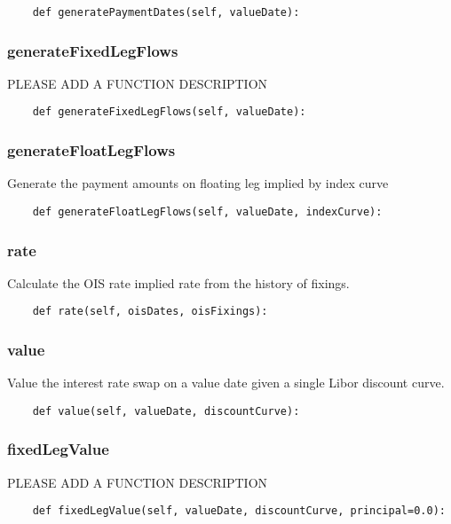 \documentclass[twoside,11pt]{book}
\begin{document}
\begin{lstlisting}
    def generatePaymentDates(self, valueDate):
\end{lstlisting}

\subsubsection*{{\bf generateFixedLegFlows}}
PLEASE ADD A FUNCTION DESCRIPTION

\begin{lstlisting}
    def generateFixedLegFlows(self, valueDate):
\end{lstlisting}

\subsubsection*{{\bf generateFloatLegFlows}}
Generate the payment amounts on floating leg implied by index curve  

\begin{lstlisting}
    def generateFloatLegFlows(self, valueDate, indexCurve):
\end{lstlisting}

\subsubsection*{{\bf rate}}
Calculate the OIS rate implied rate from the history of fixings.  

\begin{lstlisting}
    def rate(self, oisDates, oisFixings):
\end{lstlisting}

\subsubsection*{{\bf value}}
Value the interest rate swap on a value date given a single Libor discount curve.  

\begin{lstlisting}
    def value(self, valueDate, discountCurve):
\end{lstlisting}

\subsubsection*{{\bf fixedLegValue}}
PLEASE ADD A FUNCTION DESCRIPTION

\begin{lstlisting}
    def fixedLegValue(self, valueDate, discountCurve, principal=0.0):
\end{lstlisting}
\end{document}
